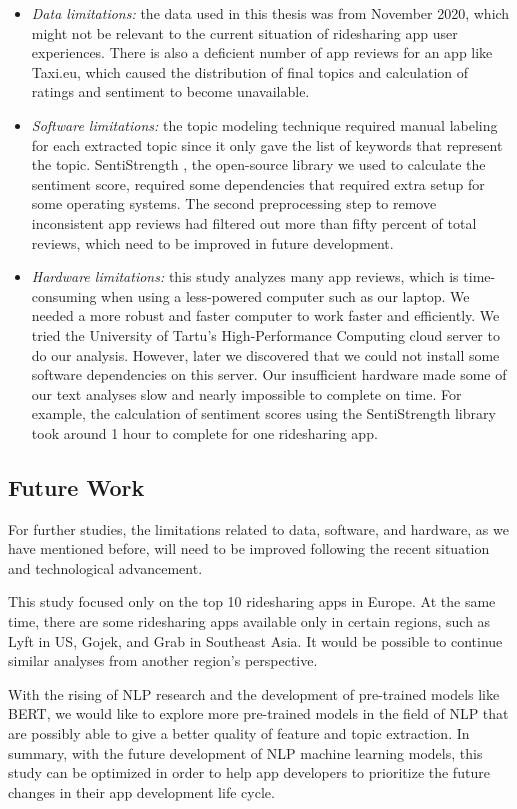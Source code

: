\documentclass[12pt]{article}
\begin{document}
\begin{itemize}
    \item \emph{Data limitations:} the data used in this thesis was from November 2020, which might not be relevant to the current situation of ridesharing app user experiences. There is also a deficient number of app reviews for an app like Taxi.eu, which caused the distribution of final topics and calculation of ratings and sentiment to become unavailable.
    \item \emph{Software limitations:} the topic modeling technique required manual labeling for each extracted topic since it only gave the list of keywords that represent the topic. SentiStrength \cite{sentistrength}, the open-source library we used to calculate the sentiment score, required some dependencies that required extra setup for some operating systems. The second preprocessing step to remove inconsistent app reviews had filtered out more than fifty percent of total reviews, which need to be improved in future development.
    \item \emph{Hardware limitations:} this study analyzes many app reviews, which is time-consuming when using a less-powered computer such as our laptop. We needed a more robust and faster computer to work faster and efficiently. We tried the University of Tartu’s High-Performance Computing cloud server to do our analysis. However, later we discovered that we could not install some software dependencies on this server. Our insufficient hardware made some of our text analyses slow and nearly impossible to complete on time. For example, the calculation of sentiment scores using the SentiStrength library took around 1 hour to complete for one ridesharing app.
\end{itemize}

\subsection{Future Work}
For further studies, the limitations related to data, software, and hardware, as we have mentioned before, will need to be improved following the recent situation and technological advancement.

This study focused only on the top 10 ridesharing apps in Europe. At the same time, there are some ridesharing apps available only in certain regions, such as Lyft in US, Gojek, and Grab in Southeast Asia. It would be possible to continue similar analyses from another region’s perspective.

With the rising of NLP research and the development of pre-trained models like BERT, we would like to explore more pre-trained models in the field of NLP that are possibly able to give a better quality of feature and topic extraction. In summary, with the future development of NLP machine learning models, this study can be optimized in order to help app developers to prioritize the future changes in their app development life cycle.
\end{document}
